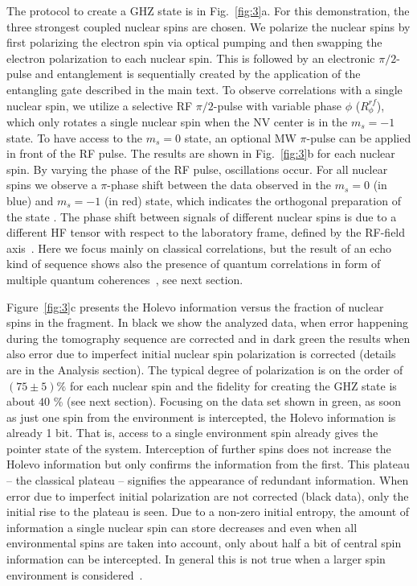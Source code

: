 \documentclass[aps,floatfix,footinbib,superscriptaddress]{revtex4-1}
\begin{document}
The protocol to create a GHZ state is in Fig.~\ref{fig:3}a. For this demonstration, the three strongest coupled nuclear spins are chosen. We polarize the nuclear spins by first polarizing the electron spin via optical pumping and then swapping the electron polarization to each nuclear spin. This is followed by an electronic $\pi/2$-pulse and entanglement is sequentially created by the application of the entangling gate described in the main text. To observe correlations with a single nuclear spin, we utilize a selective RF $\pi/2$-pulse with variable phase $\phi$ ($R^{rf}_\phi$), which only rotates a single nuclear spin when the NV center is in the $m_s = -1$ state. To have access to the $m_s=0$ state, an optional MW $\pi$-pulse can be applied in front of the RF pulse. The results are shown in Fig.~\ref{fig:3}b for each nuclear spin. By varying the phase of the RF pulse, oscillations occur. For all nuclear spins we observe a $\pi$-phase shift between the data observed in the $m_s = 0$ (in blue) and $m_s = -1$ (in red) state, which indicates the orthogonal preparation of the state . The phase shift between signals of different nuclear spins is due to a different HF tensor with respect to the laboratory frame, defined by the RF-field axis~\cite{Laraoui15}. Here we focus mainly on classical correlations, but the result of an echo kind of sequence shows also the presence of quantum correlations in form of multiple quantum coherences~\cite{Baum85,Gaerttner17}, see next section.  

Figure~\ref{fig:3}c presents the Holevo information versus the fraction of nuclear spins in the fragment. In black we show the analyzed data, when error happening during the tomography sequence are corrected and in dark green the results when also error due to imperfect initial nuclear spin polarization is corrected (details are in the Analysis section). The typical degree of polarization is on the order of $(75\pm 5) \%$ for each nuclear spin and the fidelity for creating the GHZ state is about $40$ \% (see next section). Focusing on the data set shown in green, as soon as just one spin from the environment is intercepted, the Holevo information is already 1 bit. That is, access to a single environment spin already gives the pointer state of the system. Interception of further spins does not increase the Holevo information but only confirms the information from the first. This plateau -- the classical plateau -- signifies the appearance of redundant information. When error due to imperfect initial polarization are not corrected (black data), only the initial rise to the plateau is seen. Due to a non-zero initial entropy, the amount of information a single nuclear spin can store decreases and even when all environmental spins are taken into account, only about half a bit of central spin information can be intercepted. In general this is not true when a larger spin environment is considered~\cite{Zwolak09,Zwolak10-1}. 
\end{document}
